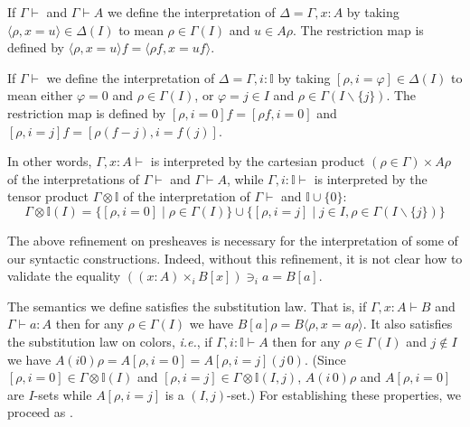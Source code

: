 \documentclass[english]{PaperTools/latex/lipics}
\newcommand\CTimes[2]{(#2) ×_{#1}}
\newcommand\op[1]{∋_{#1}}
\def\ie{\textit{i.e.}}
\begin{document}
\medskip
If $Γ⊢$ and $Γ ⊢ A$ we define the interpretation of $Δ = Γ,x:A$
by taking $⟨ρ,x=u⟩ ∈ Δ(I)$ to mean $ρ ∈ Γ(I)$ and $u ∈ Aρ$.
The restriction map is defined by $⟨ρ,x=u⟩f = ⟨ρf, x=uf⟩$.

\smallskip
If $Γ⊢$ we define the interpretation of $Δ = Γ,i:𝕀$ by taking
$[ρ,i=φ] ∈ Δ(I)$ to mean either $φ = 0$ and $ρ ∈ Γ(I)$, or
$φ = j ∈ I$ and $ρ ∈ Γ(I\backslash\{j\})$.
The restriction map is defined by
$[ρ,i=0]f = [ρf,i=0]$ and $[ρ,i=j]f = [ρ(f-j),i=f(j)]$.
\begin{remark}
  In other words,
  $Γ,x:A⊢$ is interpreted by the cartesian product $(ρ∈Γ) × Aρ$ of the
  interpretations of $Γ⊢$ and $Γ⊢A$, while
  $Γ,i:𝕀⊢$ is interpreted by the tensor product $Γ ⊗ 𝕀$ of the
  interpretation of $Γ⊢$ and $𝕀 ∪ \{0\}$:
  $$Γ ⊗ 𝕀(I) = \{ [ρ,i=0] \mid ρ ∈ Γ(I) \} ∪
               \{ [ρ,i=j] \mid j ∈ I, ρ ∈ Γ(I\backslash\{j\}) \}$$
\end{remark}


\bigskip
The above refinement on presheaves is necessary for the interpretation
of some of our syntactic constructions.  Indeed, without this refinement,
it is not clear how to validate the equality
${{(\CTimes i {x:A} B[x])} \op i a = B[a]}$.

\bigskip
The semantics we define satisfies the substitution law. That is, if $Γ,x:A ⊢ B$
and $Γ ⊢ a:A$ then for any $ρ ∈ Γ(I)$ we have
$B[a]ρ = B⟨ρ,x=aρ⟩$.
It also satisfies the substitution law on colors, \ie, if $Γ,i:𝕀 ⊢ A$
then for any $ρ ∈ Γ(I)$ and $j ∉ I$ we have
$A(i 0)ρ = A[ρ,i=0] = A[ρ,i=j](j\, 0)$.
(Since $[ρ,i=0] ∈ Γ⊗𝕀(I)$ and $[ρ,i=j] ∈ Γ⊗𝕀(I,j)$, $A(i\, 0)ρ$ and
$A[ρ,i=0]$ are $I$-sets while $A[ρ,i=j]$ is a $(I,j)$-set.)
For establishing these properties, we proceed as \citet{Aczel98onrelating}.
\end{document}
